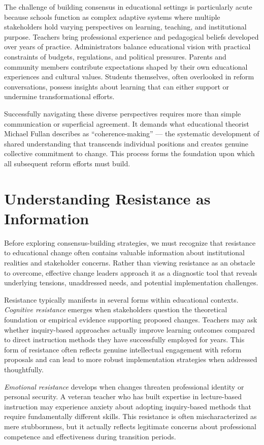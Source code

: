 \documentclass[
  Letterpaper,
]{scrbook}
\begin{document}
The challenge of building consensus in educational settings is
particularly acute because schools function as complex adaptive systems
where multiple stakeholders hold varying perspectives on learning,
teaching, and institutional purpose. Teachers bring professional
experience and pedagogical beliefs developed over years of practice.
Administrators balance educational vision with practical constraints of
budgets, regulations, and political pressures. Parents and community
members contribute expectations shaped by their own educational
experiences and cultural values. Students themselves, often overlooked
in reform conversations, possess insights about learning that can either
support or undermine transformational efforts.

Successfully navigating these diverse perspectives requires more than
simple communication or superficial agreement. It demands what
educational theorist Michael Fullan describes as ``coherence-making''
--- the systematic development of shared understanding that transcends
individual positions and creates genuine collective commitment to
change. This process forms the foundation upon which all subsequent
reform efforts must build.

\section{Understanding Resistance as
Information}\label{understanding-resistance-as-information}

Before exploring consensus-building strategies, we must recognize that
resistance to educational change often contains valuable information
about institutional realities and stakeholder concerns. Rather than
viewing resistance as an obstacle to overcome, effective change leaders
approach it as a diagnostic tool that reveals underlying tensions,
unaddressed needs, and potential implementation challenges.

Resistance typically manifests in several forms within educational
contexts. \emph{Cognitive resistance} emerges when stakeholders question
the theoretical foundation or empirical evidence supporting proposed
changes. Teachers may ask whether inquiry-based approaches actually
improve learning outcomes compared to direct instruction methods they
have successfully employed for years. This form of resistance often
reflects genuine intellectual engagement with reform proposals and can
lead to more robust implementation strategies when addressed
thoughtfully.

\emph{Emotional resistance} develops when changes threaten professional
identity or personal security. A veteran teacher who has built expertise
in lecture-based instruction may experience anxiety about adopting
inquiry-based methods that require fundamentally different skills. This
resistance is often mischaracterized as mere stubbornness, but it
actually reflects legitimate concerns about professional competence and
effectiveness during transition periods.
\end{document}
